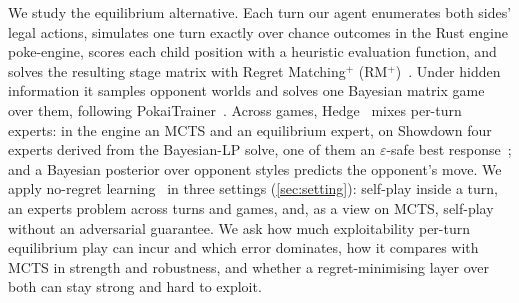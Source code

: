 \documentclass[10pt]{article}
\theoremstyle{plain}
\theoremstyle{definition}
\theoremstyle{remark}
\begin{document}
We study the equilibrium alternative. Each turn our agent enumerates both sides' legal actions, simulates one turn exactly over chance outcomes in the Rust engine poke-engine, scores each child position with a heuristic evaluation function, and solves the resulting stage matrix with Regret Matching$^+$ (RM$^+$)~\cite{Tam14}. Under hidden information it samples opponent worlds and solves one Bayesian matrix game over them, following PokaiTrainer~\cite{Yu26}. Across games, Hedge~\cite{FS97} mixes per-turn experts: in the engine an MCTS and an equilibrium expert, on Showdown four experts derived from the Bayesian-LP solve, one of them an $\varepsilon$-safe best response~\cite{Gan15}; and a Bayesian posterior over opponent styles predicts the opponent's move. We apply no-regret learning~\cite{Hannan57,LW94,FS97,CS535L6} in three settings (\cref{sec:setting}): self-play inside a turn, an experts problem across turns and games, and, as a view on MCTS, self-play without an adversarial guarantee. We ask how much exploitability per-turn equilibrium play can incur and which error dominates, how it compares with MCTS in strength and robustness, and whether a regret-minimising layer over both can stay strong and hard to exploit.
\end{document}
